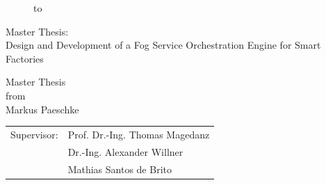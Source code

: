 \begin{titlepage}
\begin{figure}
  \begin{center}
    \hbox to 
  \end{center}
\end{figure}

\begin{center}
\rule{0pt}{0pt}
\vfill
\vfill
\vfill
\vfill

\begin{huge}
Master Thesis:\\[0.75ex]
Design and Development of a Fog Service Orchestration Engine for Smart Factories\\[0.75ex]
\end{huge}

\vfill
\vfill

Master Thesis\\ from\\

\vspace*{.5cm}
Markus Paeschke\\

\vfill
\vfill
\vfill
\vfill

\begin{tabular}{rl}
Supervisor: & Prof. Dr.-Ing. Thomas Magedanz\\
& Dr.-Ing. Alexander Willner\\
& Mathias Santos de Brito
\end{tabular}
\end{center}
\end{titlepage}

